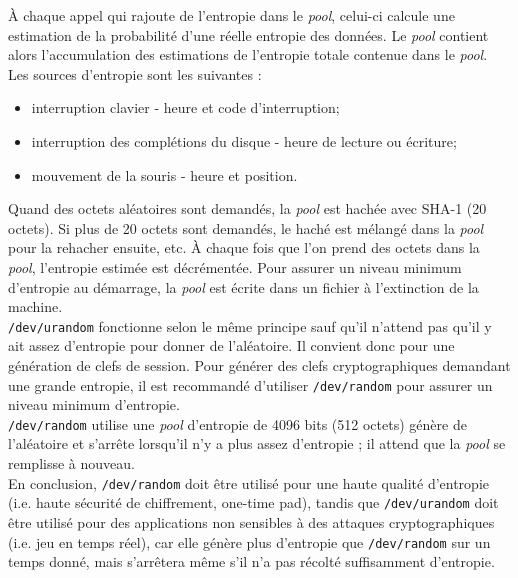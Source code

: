 			À chaque appel qui rajoute de l'entropie dans le \textit{pool}, celui-ci calcule une estimation de la probabilité d'une réelle entropie des données. Le \textit{pool} contient alors l'accumulation des estimations de l'entropie totale contenue dans le \textit{pool}.\\
						
			Les sources d'entropie sont les suivantes :
			\begin{itemize}
			\item interruption clavier - heure et code d'interruption;
			\item interruption des complétions du disque - heure de lecture ou écriture;
			\item mouvement de la souris - heure et position.\\
			\end{itemize}
			
			Quand des octets aléatoires sont demandés, la \textit{pool} est hachée avec SHA-1 (20 octets). Si plus de 20 octets sont demandés, le haché est mélangé dans la \textit{pool} pour la rehacher ensuite, etc. À chaque fois que l'on prend des octets dans la \textit{pool}, l'entropie estimée est décrémentée. Pour assurer un niveau minimum d'entropie au démarrage, la \textit{pool} est écrite dans un fichier à l'extinction de la machine.\\
			
			\texttt{/dev/urandom} fonctionne selon le même principe sauf qu'il n'attend pas qu'il y ait assez d'entropie pour donner de l'aléatoire. Il convient donc pour une génération de clefs de session. Pour générer des clefs cryptographiques demandant une grande entropie, il est recommandé d'utiliser \texttt{/dev/random} pour assurer un niveau minimum d'entropie.\\
			
			\texttt{/dev/random} utilise une \textit{pool} d'entropie de 4096 bits (512 octets) génère de l'aléatoire et s'arrête lorsqu'il n'y a plus assez d'entropie ; il attend que la \textit{pool} se remplisse à nouveau.\\
			
			En conclusion, \texttt{/dev/random} doit être utilisé pour une haute qualité d'entropie (i.e. haute sécurité de chiffrement, one-time pad), tandis que \texttt{/dev/urandom} doit être utilisé pour des applications non sensibles à des attaques cryptographiques (i.e. jeu en temps réel), car elle génère plus d'entropie que \texttt{/dev/random} sur un temps donné, mais s'arrêtera même s'il n'a pas récolté suffisamment d'entropie.\\

